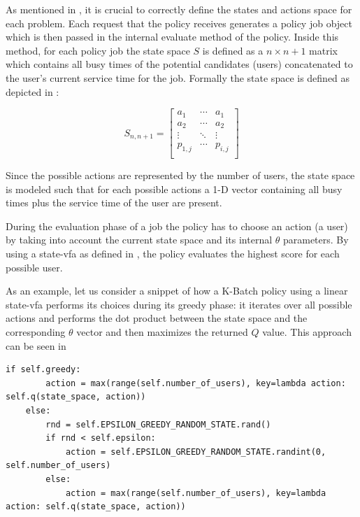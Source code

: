 \documentclass[draft=false]{seal_thesis}
\begin{document}
As mentioned in , it is crucial to correctly define the states and actions space for each problem. Each request that the policy receives generates a policy job object which is then passed in the internal evaluate method of the policy. Inside this method, for each policy job the state space $S$ is defined as a $n \times n+1$ matrix which contains all busy times of the potential candidates (\ie users) concatenated to the user's current service time for the job. Formally the state space is defined as depicted in :

\begin{equation}
\label{eq:kbatch_sp}
	S_{n,n+1} = 
	\begin{bmatrix}
	a_1 & \cdots & a_1 \\
	a_2 & \cdots & a_2 \\
	\vdots & \ddots & \vdots \\
	p_{1,j} & \cdots & p_{i,j} \\
	\end{bmatrix}
\end{equation}

Since the possible actions are represented by the number of users, the state space is modeled such that for each possible actions a 1-D vector containing all busy times plus the service time of the user are present.

During the evaluation phase of a job the policy has to choose an action (\ie a user) by taking into account the current state space and its internal $\theta$ parameters. By using a state-\gls{vfa} as defined in , the policy evaluates the highest score for each possible user.

As an example, let us consider a snippet of how a K-Batch policy using a linear state-\gls{vfa} performs its choices during its greedy phase: it iterates over all possible actions and performs the dot product between the state space and the corresponding $\theta$ vector and then maximizes the returned $Q$ value. This approach can be seen in  

\begin{lstlisting}[caption=\gls{ep} approach,label=lst:e_greedy,style=CustomPython]
    if self.greedy:
        action = max(range(self.number_of_users), key=lambda action: self.q(state_space, action))
    else:
        rnd = self.EPSILON_GREEDY_RANDOM_STATE.rand()
        if rnd < self.epsilon:
            action = self.EPSILON_GREEDY_RANDOM_STATE.randint(0, self.number_of_users)
        else:
            action = max(range(self.number_of_users), key=lambda action: self.q(state_space, action))
\end{lstlisting}
\end{document}
